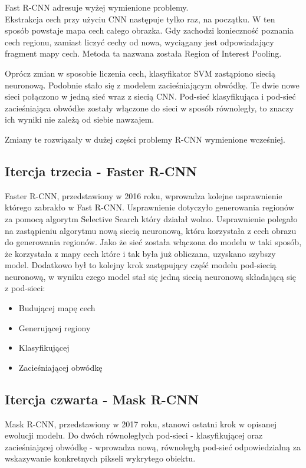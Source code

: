 Fast R-CNN adresuje wyżej wymienione problemy. \\

Ekstrakcja cech przy użyciu CNN następuje tylko raz, na początku. W ten sposób powstaje mapa cech całego obrazka. Gdy zachodzi konieczność poznania cech regionu, zamiast liczyć cechy od nowa, wyciągany jest odpowiadający fragment mapy cech. Metoda ta nazwana została Region of Interest Pooling.

Oprócz zmian w sposobie liczenia cech, klasyfikator SVM zastąpiono siecią neuronową. Podobnie stało się z modelem zacieśniającym obwódkę. Te dwie nowe sieci połączono w jedną sieć wraz z siecią CNN. Pod-sieć klasyfikująca i pod-sieć zacieśniająca obwódke zostały włączone do sieci w sposób równoległy, to znaczy ich wyniki nie zależą od siebie nawzajem.

Zmiany te rozwiązały w dużej części problemy R-CNN wymienione wcześniej.

\subsection{Itercja trzecia - Faster R-CNN}

Faster R-CNN, przedstawiony w 2016 roku, wprowadza kolejne usprawnienie którego zabrakło w Fast R-CNN. Usprawnienie dotyczyło generowania regionów za pomocą algorytm Selective Search który działał wolno. Usprawnienie polegało na zastąpieniu algorytmu nową siecią neuronową, która korzystała z cech obrazu do generowania regionów. Jako że sieć została włączona do modelu w taki sposób, że korzystała z mapy cech które i tak była już obliczana, uzyskano szybszy model. Dodatkowo był to kolejny krok zastępujący część modelu pod-siecią neuronową, w wyniku czego model stał się jedną siecią neuronową składającą się z pod-sieci:

\begin{itemize}
	\item Budującej mapę cech
	\item Generującej regiony
	\item Klasyfikującej
	\item Zacieśniającej obwódkę
\end{itemize}

\subsection{Itercja czwarta - Mask R-CNN}

Mask R-CNN, przedstawiony w 2017 roku, stanowi ostatni krok w opisanej ewolucji modelu. Do dwóch równoległych pod-sieci - klasyfikującej oraz zacieśniającej obwódkę - wprowadza nową, równoległą pod-sieć odpowiedzialną za wskazywanie konkretnych pikseli wykrytego obiektu.


